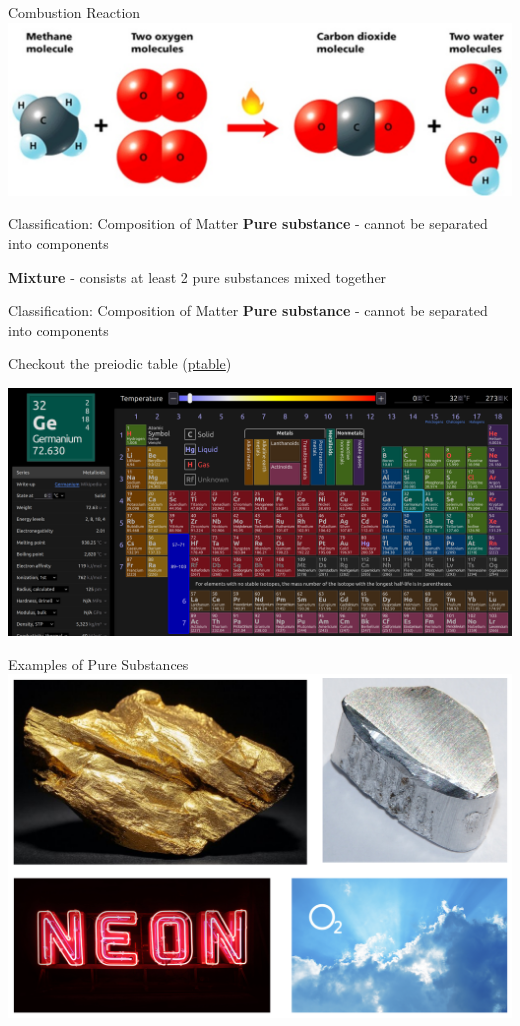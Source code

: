 \documentclass[11pt]{beamer}
\begin{document}
\begin{frame}{Combustion Reaction}
  \centering
  \includegraphics[scale=0.175]{methane_burn}
\end{frame}

\begin{frame}{Classification: Composition of Matter}
  \textbf{Pure substance} - cannot be separated into components

  \textbf{Mixture} - consists at least 2 pure substances mixed
  together
\end{frame}

\begin{frame}{Classification: Composition of Matter}
  \textbf{Pure substance} - cannot be separated into components
  
  Checkout the preiodic table (\href{https://ptable.com}{ptable})
  
  \centering
  \includegraphics[width=\linewidth]{ptable}
\end{frame}

\begin{frame}{Examples of Pure Substances}
  \centering
  \includegraphics[width=\linewidth]{pure}
\end{frame}
\end{document}
